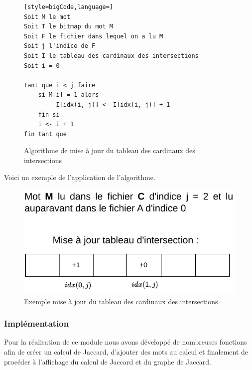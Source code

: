 \documentclass[a4paper, 12pt]{article}
\begin{document}
\begin{figure}[h]
\centering
\begin{tcolorbox}[center upper,
enhanced,
colback=darkWhite,
boxrule=0pt,
frame hidden,
width=0.8\textwidth]
\begin{lstlisting}[style=bigCode,language=]
Soit M le mot
Soit T le bitmap du mot M
Soit F le fichier dans lequel on a lu M
Soit j l'indice de F
Soit I le tableau des cardinaux des intersections
Soit i = 0

tant que i < j faire
    si M[i] = 1 alors
         I[idx(i, j)] <- I[idx(i, j)] + 1
    fin si
    i <- i + 1
fin tant que
\end{lstlisting}
\end{tcolorbox}
\caption{Algorithme de mise à jour du tableau des cardinaux des intersections }
\label{fig:algo_inter}
\end{figure}

Voici un exemple de l'application de l'algorithme.

\begin{figure}[H]
\centering
\begin{tcolorbox}[enhanced,
colback=white,
colframe=codeblue,
fonttitle=\bfseries,
title=Exemple,
boxrule=2pt,
width=0.8\textwidth]
\includegraphics[width=\textwidth]{algo_inter.pdf}
\end{tcolorbox}
\caption{Exemple mise à jour du tableau des cardinaux des intersections}
\label{fig:algo_inter}
\end{figure}


\subsubsection{Implémentation}

Pour la réalisation de ce module nous avons développé de nombreuses fonctions afin de créer un calcul de Jaccard, d'ajouter des mots au calcul et finalement de procéder à l'affichage du calcul de Jaccard et du graphe de Jaccard.
\end{document}
